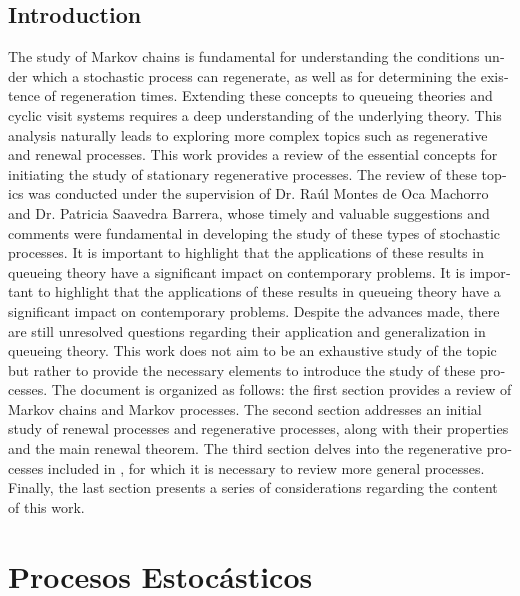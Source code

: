 \documentclass{article}
\renewcommand{\abstractname}{Resumen}
\numberwithin{equation}{section}
\begin{document}
\begin{otherlanguage}{english}
\renewcommand{\abstractname}{Abstract} %
\section*{Introduction}

The study of Markov chains is fundamental for understanding the conditions under which a stochastic process can regenerate, as well as for determining the existence of regeneration times. Extending these concepts to queueing theories and cyclic visit systems requires a deep understanding of the underlying theory. This analysis naturally leads to exploring more complex topics such as regenerative and renewal processes. This work provides a review of the essential concepts for initiating the study of stationary regenerative processes. The review of these topics was conducted under the supervision of Dr. Raúl Montes de Oca Machorro and Dr. Patricia Saavedra Barrera, whose timely and valuable suggestions and comments were fundamental in developing the study of these types of stochastic processes. It is important to highlight that the applications of these results in queueing theory have a significant impact on contemporary problems. It is important to highlight that the applications of these results in queueing theory have a significant impact on contemporary problems. Despite the advances made, there are still unresolved questions regarding their application and generalization in queueing theory. This work does not aim to be an exhaustive study of the topic but rather to provide the necessary elements to introduce the study of these processes. The document is organized as follows: the first section provides a review of Markov chains and Markov processes. The second section addresses an initial study of renewal processes and regenerative processes, along with their properties and the main renewal theorem. The third section delves into the regenerative processes included in \cite{Thorisson}, for which it is necessary to review more general processes. Finally, the last section presents a series of considerations regarding the content of this work.

\end{otherlanguage}


\section{Procesos Estoc\'asticos}\label{Procesos.Estocasticos}
\end{document}
